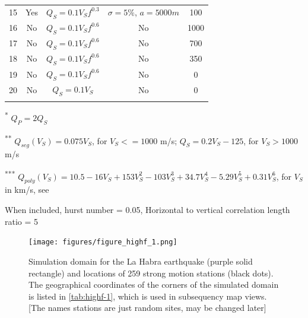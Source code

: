 \begin{table}[!ht]
\begin{threeparttable}
{\begin{tabular}{@{}ccccc@{}}
        15        & Yes        & $Q_S=0.1V_Sf^{0.3}$              & $\sigma=5\%$, $a=5000m$ & 100\\
        16       & No         & $Q_S=0.1V_Sf^{0.6}$               & No                     & 1000  \\
        17       & No         & $Q_S=0.1V_Sf^{0.6}$               & No                     & 700\\
        18       & No         & $Q_S=0.1V_Sf^{0.6}$               & No                     & 350\\
        19       & No         & $Q_S=0.1V_Sf^{0.6}$               & No                     & 0  \\
        20       & No         & $Q_S=0.1V_S$                      & No                     & 0  \\\bottomrule
        \\[-5mm]
      \end{tabular}%
    }
    \begin{tablenotes}
      \item[\textsuperscript{*}] \footnotesize $Q_P=2Q_S$\\[-6pt]
      \item[\textsuperscript{**}] \footnotesize $Q_{seg}(V_S)=0.075V_S$, for $V_S <= 1000$ m/s; $Q_S=0.2V_S - 125$, for $V_S > 1000$ m/s\\[-3pt]
      \item[\textsuperscript{***}] \footnotesize $Q_{poly}(V_S)=10.5 - 16V_S + 153V_S^2 - 103V_S^3 + 34.7V_S^4 - 5.29V_S^5 + 0.31V_S^6$, for $V_S$ in km/s, see \citet{taborda2014ground}\\[-4pt]
      \item[\textdagger] \footnotesize When included, hurst number = 0.05, Horizontal to vertical correlation length ratio = 5
    \end{tablenotes}
  \end{threeparttable}
\end{table}
\clearpage


\begin{figure}[!ht]
  \centering
  \texttt{[image: figures/figure\_highf\_1.png]}
  \caption{Simulation domain for the La Habra earthquake (purple solid rectangle) and locations of 259 strong motion stations (black dots). The geographical coordinates of the corners of the simulated domain is listed in \cref{tab:highf-1}, which is used in subsequency map views. [The names stations are just random sites, may be changed later]}
  \label{fig:highf-1}
\end{figure}
\clearpage

